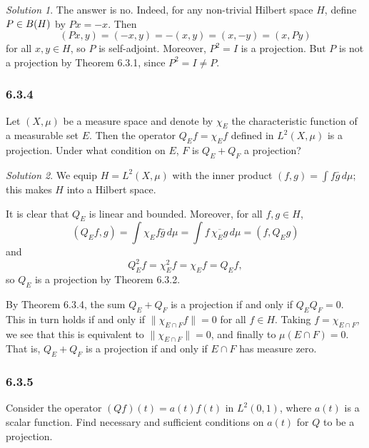 \documentclass{report}
\newcommand{\norm}[1]{{\lVert #1 \rVert}}
\let\sc\relax
\newcommand{\sc}[1]{\mathscr{#1}}
\theoremstyle{remark}
\newtheorem*{solution}{Solution}
\begin{document}
\begin{solution}
  The answer is no. Indeed, for any non-trivial Hilbert space $H$, define $P \in \sc B(H)$ by $Px = -x$. Then
  \begin{equation*}
    (Px,y) = (-x,y) = -(x,y) = (x,-y) = (x,Py)
  \end{equation*}
  for all $x,y \in H$, so $P$ is self-adjoint. Moreover, $P^2 = I$ is a projection. But $P$ is not a projection by Theorem 6.3.1, since $P^2 = I \ne P$.
\end{solution}

\subsubsection*{6.3.4}
Let $(X,\mu)$ be a measure space and denote by $\chi_E$ the characteristic function of a measurable set $E$. Then the operator $Q_E f = \chi_E f$ defined in $L^2(X,\mu)$ is a projection. Under what condition on $E$, $F$ is $Q_E + Q_F$ a projection?

\begin{solution}
  We equip $H = L^2(X,\mu)$ with the inner product $(f,g) = \int f \bar g \, d\mu$; this makes $H$ into a Hilbert space.

  It is clear that $Q_E$ is linear and bounded. Moreover, for all $f,g \in H$,
  \begin{equation*}
    (Q_E f, g) = \int \chi_E f \bar g \, d\mu = \int f \, \overline{\chi_E g} \, d\mu = (f, Q_E g)
  \end{equation*}
  and
  \begin{equation*}
    Q_E^2 f = \chi_E^2 f = \chi_E f = Q_E f,
  \end{equation*}
  so $Q_E$ is a projection by Theorem 6.3.2.

  By Theorem 6.3.4, the sum $Q_E + Q_F$ is a projection if and only if $Q_E Q_F = 0$. This in turn holds if and only if $\norm{\chi_{E \cap F} f} = 0$ for all $f \in H$. Taking $f = \chi_{E \cap F}$, we see that this is equivalent to $\norm{\chi_{E \cap F}} = 0$, and finally to $\mu(E \cap F) = 0$. That is, $Q_E + Q_F$ is a projection if and only if $E \cap F$ has measure zero.
\end{solution}

\subsubsection*{6.3.5}
Consider the operator $(Qf)(t) = a(t) f(t)$ in $L^2(0,1)$, where $a(t)$ is a scalar function. Find necessary and sufficient conditions on $a(t)$ for $Q$ to be a projection.
\end{document}
